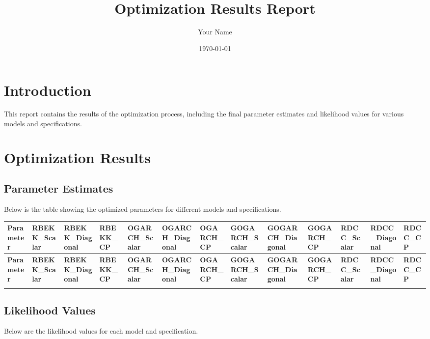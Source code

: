 \documentclass{article}
\begin{document}
\title{Optimization Results Report}
\author{Your Name}
\date{\today}
\maketitle

\section{Introduction}
This report contains the results of the optimization process, including the final parameter estimates and likelihood values for various models and specifications.

\section{Optimization Results}

\subsection{Parameter Estimates}
Below is the table showing the optimized parameters for different models and specifications.

\begin{longtable}{|l|l|l|l|l|l|l|l|l|l|l|l|}
\hline
\textbf{Parameter} & \textbf{RBEKK\_Scalar} & \textbf{RBEKK\_Diagonal} & \textbf{RBEKK\_CP} & \textbf{OGARCH\_Scalar} & \textbf{OGARCH\_Diagonal} & \textbf{OGARCH\_CP} & \textbf{GOGARCH\_Scalar} & \textbf{GOGARCH\_Diagonal} & \textbf{GOGARCH\_CP} & \textbf{RDCC\_Scalar} & \textbf{RDCC\_Diagonal} & \textbf{RDCC\_CP} \\
\hline
\endfirsthead

\hline
\textbf{Parameter} & \textbf{RBEKK\_Scalar} & \textbf{RBEKK\_Diagonal} & \textbf{RBEKK\_CP} & \textbf{OGARCH\_Scalar} & \textbf{OGARCH\_Diagonal} & \textbf{OGARCH\_CP} & \textbf{GOGARCH\_Scalar} & \textbf{GOGARCH\_Diagonal} & \textbf{GOGARCH\_CP} & \textbf{RDCC\_Scalar} & \textbf{RDCC\_Diagonal} & \textbf{RDCC\_CP} \\
\hline
\endhead

\hline
\endfoot



\end{longtable}

\subsection{Likelihood Values}
Below are the likelihood values for each model and specification.

\end{document}
